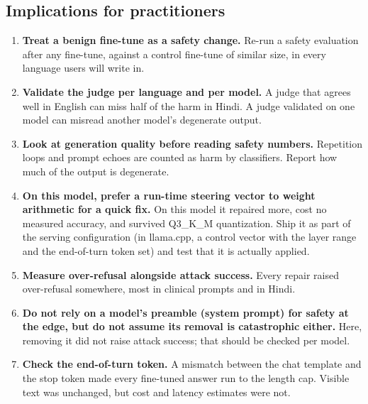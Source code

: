 \subsection{Implications for practitioners}
\begin{enumerate}
\item \textbf{Treat a benign fine-tune as a safety change.} Re-run a safety evaluation after any fine-tune, against a control fine-tune of similar size, in every language users will write in.
\item \textbf{Validate the judge per language and per model.} A judge that agrees well in English can miss half of the harm in Hindi. A judge validated on one model can misread another model's degenerate output.
\item \textbf{Look at generation quality before reading safety numbers.} Repetition loops and prompt echoes are counted as harm by classifiers. Report how much of the output is degenerate.
\item \textbf{On this model, prefer a run-time steering vector to weight arithmetic for a quick fix.} On this model it repaired more, cost no measured accuracy, and survived Q3\_K\_M quantization. Ship it as part of the serving configuration (in llama.cpp, a control vector with the layer range and the end-of-turn token set) and test that it is actually applied.
\item \textbf{Measure over-refusal alongside attack success.} Every repair raised over-refusal somewhere, most in clinical prompts and in Hindi.
\item \textbf{Do not rely on a model's preamble (system prompt) for safety at the edge, but do not assume its removal is catastrophic either.} Here, removing it did not raise attack success; that should be checked per model.
\item \textbf{Check the end-of-turn token.} A mismatch between the chat template and the stop token made every fine-tuned answer run to the length cap. Visible text was unchanged, but cost and latency estimates were not.
\end{enumerate}
